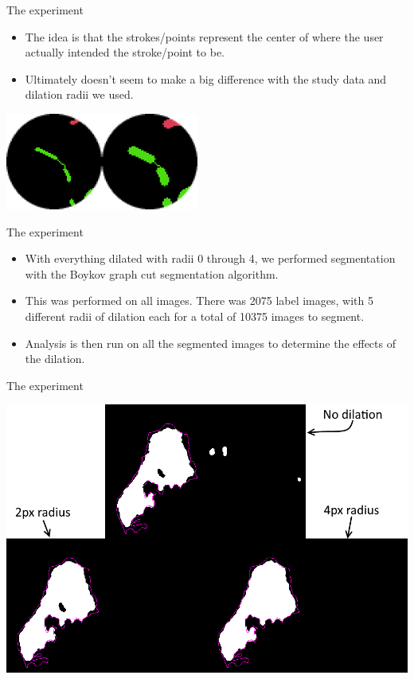 \documentclass[14pt,xcolor=dvipsnames]{beamer}
\begin{document}
\begin{frame}[fragile,t]{The experiment}
	\begin{itemize}
		\item The idea is that the strokes/points represent the center of where the user actually intended the stroke/point to be.
		\item Ultimately doesn't seem to make a big difference with the study data and dilation radii we used.
	\end{itemize}
	\begin{center}
		\includegraphics[height=120px]{dilate_example_zoomed_comparison}
	\end{center}
\end{frame}

\begin{frame}[fragile,t]{The experiment}
	\begin{itemize}
		\item With everything dilated with radii 0 through 4, we performed segmentation with the Boykov graph cut segmentation algorithm.
		\item This was performed on all images. There was 2075 label images, with 5 different radii of dilation each for a total of 10375 images to segment.
		\item Analysis is then run on all the segmented images to determine the effects of the dilation.
	\end{itemize}
\end{frame}

\begin{frame}[fragile,t]{The experiment}
	\begin{center}
		\includegraphics[width=\paperheight]{segmentation_example_all}
	\end{center}
\end{frame}
\end{document}
